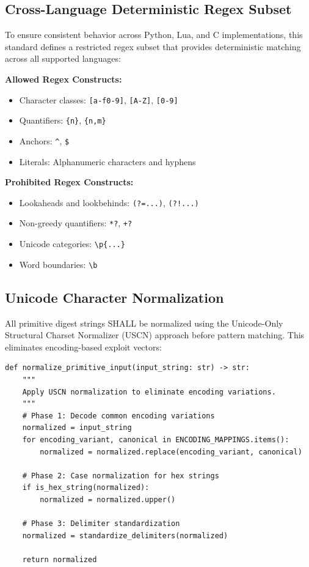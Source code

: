 \documentclass[11pt,a4paper]{article}
\begin{document}
\subsection{Cross-Language Deterministic Regex Subset}

To ensure consistent behavior across Python, Lua, and C implementations, this standard defines a restricted regex subset that provides deterministic matching across all supported languages:

\textbf{Allowed Regex Constructs:}
\begin{itemize}
    \item Character classes: \texttt{[a-f0-9]}, \texttt{[A-Z]}, \texttt{[0-9]}
    \item Quantifiers: \texttt{\{n\}}, \texttt{\{n,m\}}
    \item Anchors: \texttt{\^{}}, \texttt{\$}
    \item Literals: Alphanumeric characters and hyphens
\end{itemize}

\textbf{Prohibited Regex Constructs:}
\begin{itemize}
    \item Lookaheads and lookbehinds: \texttt{(?=...)}, \texttt{(?!...)}
    \item Non-greedy quantifiers: \texttt{*?}, \texttt{+?}
    \item Unicode categories: \texttt{\textbackslash p\{...\}}
    \item Word boundaries: \texttt{\textbackslash b}
\end{itemize}

\subsection{Unicode Character Normalization}

All primitive digest strings SHALL be normalized using the Unicode-Only Structural Charset Normalizer (USCN) approach before pattern matching. This eliminates encoding-based exploit vectors:

\begin{lstlisting}[caption=Unicode Normalization Implementation]
def normalize_primitive_input(input_string: str) -> str:
    """
    Apply USCN normalization to eliminate encoding variations.
    """
    # Phase 1: Decode common encoding variations
    normalized = input_string
    for encoding_variant, canonical in ENCODING_MAPPINGS.items():
        normalized = normalized.replace(encoding_variant, canonical)
    
    # Phase 2: Case normalization for hex strings
    if is_hex_string(normalized):
        normalized = normalized.upper()
    
    # Phase 3: Delimiter standardization
    normalized = standardize_delimiters(normalized)
    
    return normalized
\end{lstlisting}
\end{document}
